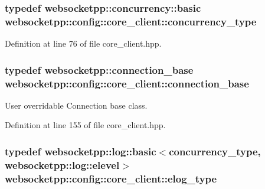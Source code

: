 \hypertarget{structwebsocketpp_1_1config_1_1core__client_a4efeeb870e648c7405daab92d10fa5d6}{}
\subsubsection[{concurrency\+\_\+type}]{\setlength{\rightskip}{0pt plus 5cm}typedef {\bf websocketpp\+::concurrency\+::basic} {\bf websocketpp\+::config\+::core\+\_\+client\+::concurrency\+\_\+type}}\label{structwebsocketpp_1_1config_1_1core__client_a4efeeb870e648c7405daab92d10fa5d6}


Definition at line 76 of file core\+\_\+client.\+hpp.

\hypertarget{structwebsocketpp_1_1config_1_1core__client_a21e23793ee1a435b3a036166d0d70504}{}
\subsubsection[{connection\+\_\+base}]{\setlength{\rightskip}{0pt plus 5cm}typedef {\bf websocketpp\+::connection\+\_\+base} {\bf websocketpp\+::config\+::core\+\_\+client\+::connection\+\_\+base}}\label{structwebsocketpp_1_1config_1_1core__client_a21e23793ee1a435b3a036166d0d70504}


User overridable Connection base class. 



Definition at line 155 of file core\+\_\+client.\+hpp.

\hypertarget{structwebsocketpp_1_1config_1_1core__client_a24f1bae9e8a92bf7950153ed39eaffb8}{}
\subsubsection[{elog\+\_\+type}]{\setlength{\rightskip}{0pt plus 5cm}typedef {\bf websocketpp\+::log\+::basic}$<${\bf concurrency\+\_\+type}, {\bf websocketpp\+::log\+::elevel}$>$ {\bf websocketpp\+::config\+::core\+\_\+client\+::elog\+\_\+type}}\label{structwebsocketpp_1_1config_1_1core__client_a24f1bae9e8a92bf7950153ed39eaffb8}


